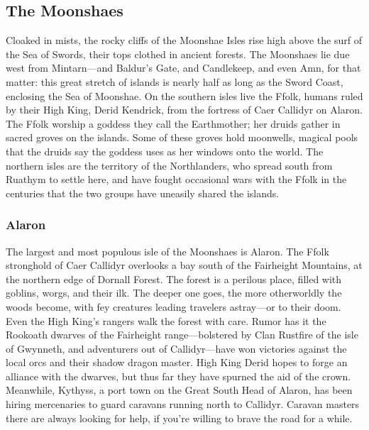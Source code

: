 \documentclass[10pt,a4paper,twoside,twocolumn,openany,bg=print,nodeprecatedcode]{dndbook}
\begin{document}
\subsection{The Moonshaes}
Cloaked in mists, the rocky cliffs of the Moonshae Isles rise high above the surf of the Sea of Swords, their tops clothed in ancient forests. The Moonshaes lie due west from Mintarn—and Baldur's Gate, and Candlekeep, and even Amn, for that matter: this great stretch of islands is nearly half as long as the Sword Coast, enclosing the Sea of Moonshae.
On the southern isles live the Ffolk, humans ruled by their High King, Derid Kendrick, from the fortress of Caer Callidyr on Alaron. The Ffolk worship a goddess they call the Earthmother; her druids gather in sacred groves on the islands. Some of these groves hold moonwells, magical pools that the druids say the goddess uses as her windows onto the world.
The northern isles are the territory of the Northlanders, who spread south from Ruathym to settle here, and have fought occasional wars with the Ffolk in the centuries that the two groups have uneasily shared the islands.
\subsubsection{Alaron}
The largest and most populous isle of the Moonshaes is Alaron. The Ffolk stronghold of Caer Callidyr overlooks a bay south of the Fairheight Mountains, at the northern edge of Dornall Forest. The forest is a perilous place, filled with goblins, worgs, and their ilk. The deeper one goes, the more otherworldly the woods become, with fey creatures leading travelers astray—or to their doom. Even the High King's rangers walk the forest with care.
Rumor has it the Rookoath dwarves of the Fairheight range—bolstered by Clan Rustfire of the isle of Gwynneth, and adventurers out of Callidyr—have won victories against the local orcs and their shadow dragon master. High King Derid hopes to forge an alliance with the dwarves, but thus far they have spurned the aid of the crown.
Meanwhile, Kythyss, a port town on the Great South Head of Alaron, has been hiring mercenaries to guard caravans running north to Callidyr. Caravan masters there are always looking for help, if you're willing to brave the road for a while.
\end{document}
